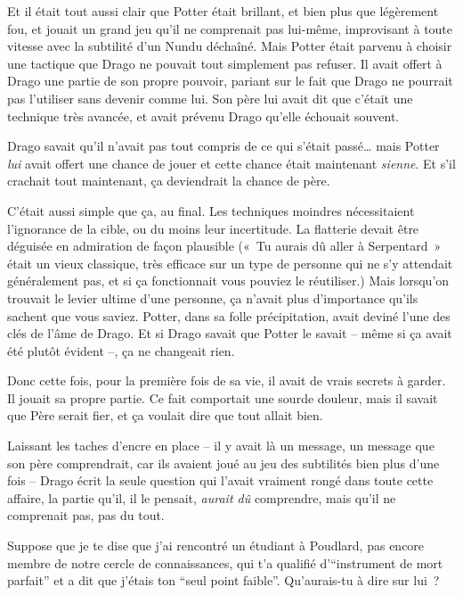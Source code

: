 Et il était tout aussi clair que Potter était brillant, et bien plus que légèrement fou, et jouait un grand jeu qu'il ne comprenait pas lui-même, improvisant à toute vitesse avec la subtilité d'un Nundu déchaîné. Mais Potter était parvenu à choisir une tactique que Drago ne pouvait tout simplement pas refuser. Il avait offert à Drago une partie de son propre pouvoir, pariant sur le fait que Drago ne pourrait pas l'utiliser sans devenir comme lui. Son père lui avait dit que c'était une technique très avancée, et avait prévenu Drago qu'elle échouait souvent.

Drago savait qu'il n'avait pas tout compris de ce qui s'était passé… mais Potter \emph{lui} avait offert une chance de jouer et cette chance était maintenant \emph{sienne}. Et s'il crachait tout maintenant, ça deviendrait la chance de père.

C'était aussi simple que ça, au final. Les techniques moindres nécessitaient l'ignorance de la cible, ou du moins leur incertitude. La flatterie devait être déguisée en admiration de façon plausible («~Tu aurais dû aller à Serpentard~» était un vieux classique, très efficace sur un type de personne qui ne s'y attendait généralement pas, et si ça fonctionnait vous pouviez le réutiliser.) Mais lorsqu'on trouvait le levier ultime d'une personne, ça n'avait plus d'importance qu'ils sachent que vous saviez. Potter, dans sa folle précipitation, avait deviné l'une des clés de l'âme de Drago. Et si Drago savait que Potter le savait -- même si ça avait été plutôt évident --, ça ne changeait rien.

Donc cette fois, pour la première fois de sa vie, il avait de vrais secrets à garder. Il jouait sa propre partie. Ce fait comportait une sourde douleur, mais il savait que Père serait fier, et ça voulait dire que tout allait bien.

Laissant les taches d'encre en place -- il y avait là un message, un message que son père comprendrait, car ils avaient joué au jeu des subtilités bien plus d'une fois -- Drago écrit la seule question qui l'avait vraiment rongé dans toute cette affaire, la partie qu'il, il le pensait, \emph{aurait dû} comprendre, mais qu'il ne comprenait pas, pas du tout.

\begin{writtenNote}

Suppose que je te dise que j'ai rencontré un étudiant à Poudlard, pas encore membre de notre cercle de connaissances, qui t'a qualifié d’“instrument de mort parfait” et a dit que j'étais ton “seul point faible”. Qu'aurais-tu à dire sur lui~?

\end{writtenNote}

